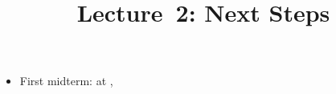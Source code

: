 \documentclass[10pt]{beamer}
\def\lecnum{2}
\begin{document}
\title{Lecture~\lecnum{}: Next Steps}

\begin{frame}
  \titlepage
\end{frame}

\begin{frame}[plain]
  \centering
  \resizebox{\linewidth}{!}{\tiny}
\end{frame}

\begin{frame}
  \begin{itemize}
  \item First midterm: {\pgfmathparse{\examdates[0]}\pgfmathresult} at \examtime{}, \examlocation{}
  \end{itemize}
\end{frame}
\end{document}
